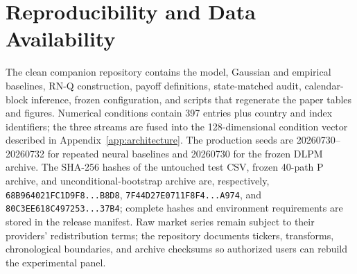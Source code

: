 ﻿\documentclass[12pt,letterpaper]{article}
\begin{document}
\begin{table}[ht]
\singlespacing
\centering
\caption{Finance-aware regularizer weights in the frozen configuration}
\label{tab:financeweights}
\end{table}

\clearpage
\section{Reproducibility and Data Availability}
The clean companion repository contains the model, Gaussian and empirical
baselines, RN-Q construction, payoff definitions, state-matched audit,
calendar-block inference, frozen configuration, and scripts that regenerate
the paper tables and figures. Numerical conditions contain 397 entries plus
country and index identifiers; the three streams are fused into the
128-dimensional condition vector described in Appendix~\ref{app:architecture}.
The production seeds are 20260730--20260732 for repeated neural baselines and
20260730 for the frozen DLPM archive. The SHA-256 hashes of the untouched test
CSV, frozen 40-path P archive, and unconditional-bootstrap archive are,
respectively,
\texttt{68B964021FC1D9F8...B8D8},
\texttt{7F44D27E0711F8F4...A974}, and
\texttt{80C3EE618C497253...37B4}; complete hashes and environment requirements
are stored in the release manifest. Raw market series remain subject to their
providers' redistribution terms; the repository documents tickers, transforms,
chronological boundaries, and archive checksums so authorized users can rebuild
the experimental panel.
\end{document}
